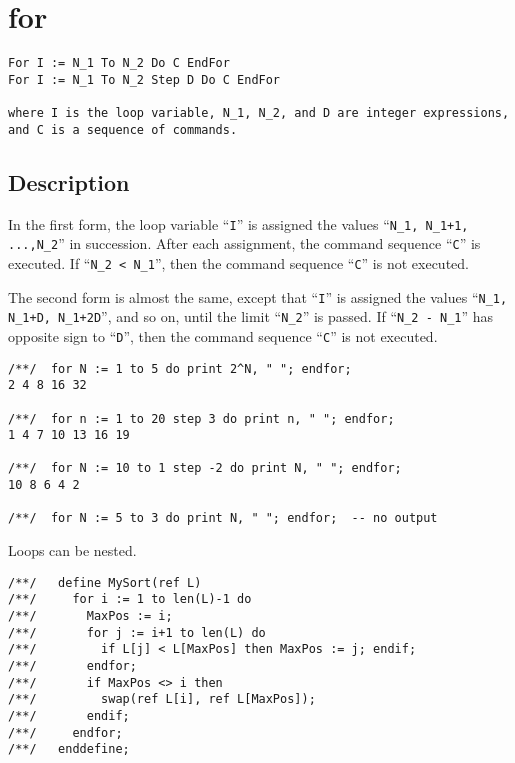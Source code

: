 \documentclass[a4paper]{mybook}
\newenvironment{command}{}{} %
\begin{document}
\section{for}
\label{for}
\begin{command} %


\begin{Verbatim}[label=syntax, rulecolor=\color{MidnightBlue},
frame=single]
For I := N_1 To N_2 Do C EndFor
For I := N_1 To N_2 Step D Do C EndFor

where I is the loop variable, N_1, N_2, and D are integer expressions,
and C is a sequence of commands.
\end{Verbatim}


\subsection*{Description}

In the first form, the loop variable ``\verb&I&'' is assigned the values
``\verb&N_1, N_1+1, ...,N_2&'' in succession.  After each assignment,
the command sequence ``\verb&C&'' is executed.  If ``\verb&N_2 < N_1&'', then
the command sequence ``\verb&C&'' is not executed.
\par 
The second form is almost the same, except that ``\verb&I&'' is assigned the
values ``\verb&N_1, N_1+D, N_1+2D&'', and so on, until the limit ``\verb&N_2&'' is
passed.  If ``\verb&N_2 - N_1&'' has opposite sign to ``\verb&D&'', then the command
sequence ``\verb&C&'' is not executed.
\begin{Verbatim}[label=example, rulecolor=\color{PineGreen}, frame=single]
/**/  for N := 1 to 5 do print 2^N, " "; endfor;
2 4 8 16 32

/**/  for n := 1 to 20 step 3 do print n, " "; endfor;
1 4 7 10 13 16 19

/**/  for N := 10 to 1 step -2 do print N, " "; endfor;
10 8 6 4 2

/**/  for N := 5 to 3 do print N, " "; endfor;  -- no output
\end{Verbatim}

Loops can be nested.
\begin{Verbatim}[label=example, rulecolor=\color{PineGreen}, frame=single]
/**/   define MySort(ref L)
/**/     for i := 1 to len(L)-1 do
/**/       MaxPos := i;
/**/       for j := i+1 to len(L) do
/**/         if L[j] < L[MaxPos] then MaxPos := j; endif;
/**/       endfor;
/**/       if MaxPos <> i then
/**/         swap(ref L[i], ref L[MaxPos]);
/**/       endif;
/**/     endfor;
/**/   enddefine;


\end{Verbatim}
\end{command}
\end{document}
